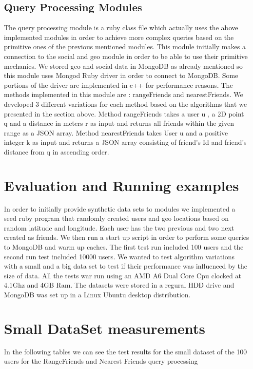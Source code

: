 \documentclass[prodmode,acmtods]{acmsmall} %
\begin{document}
\subsection{Query Processing Modules}
The query processing module is a ruby class file which actually uses the above implemented modules in order to achieve more complex queries based on the primitive ones of the previous mentioned modules.
This module initially makes a connection to the social and geo module in order to be able to use their primitive mechanics. We stored geo and social data in MongoDB as already mentioned so this module uses Mongod Ruby driver in order to connect to MongoDB. Some portions of the driver are implemented in c++ for performance reasons. The methods implemented in this module are : rangeFriends and nearestFriends. We developed 3 different variations for each method based on the algorithms that we presented in the section above.
Method rangeFriends takes a user u , a 2D point q and a distance in meters r as input and returns all friends within the given range as a JSON array.
Method nearestFriends takes User u and a positive integer k as input and returns a JSON array consisting of friend's Id and friend's distance from q in ascending order.



\section{Evaluation and Running examples}
In order to initially provide synthetic data sets to modules we implemented a seed ruby program that randomly created users and geo locations based on random latitude and longitude. Each user has the two previous and two next created as friends. We then run a start up script in order to perform some queries to MongoDB and warm up caches. The first test run included 100 users and the second run test included 10000 users. We wanted to test algorithm variations with a small and a big data set to test if their performance was influenced by the size of data. All the tests war run using an AMD A6 Dual Core Cpu clocked at 4.1Ghz and 4GB Ram. The datasets were stored in a regural HDD drive and MongoDB was set up in a Linux Ubuntu desktop distribution.

\section{Small DataSet measurements}
In the following tables we can see the test results for the small dataset of the 100 users
for the RangeFriends and Nearest Friends query processing
\newline
\end{document}
